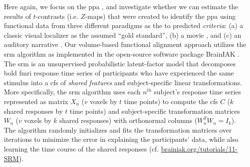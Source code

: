 Here again, we focus on the \ac{ppa} \citep[e.g.,][for
reviews]{epstein2014neural, aminoff2013role}, and investigate whether we can
estimate the results of $t$-contrasts (i.e. $Z$-maps) that were created to
identify the \ac{ppa} using functional data from three different paradigms as
the to predicted \textit{criteria}:
%
(a) a classic visual localizer \citep{sengupta2016extension} as the assumed
``gold standard'',
%
(b) a movie \citep{haeusler2022processing}, and
%
(c) an auditory narrative \citep{haeusler2022processing}.
Our volume-based functional alignment approach utilizes the \ac{srm} algorithm
\citep{chen2015reduced, richard2019fast} as implemented in the open-source
software package BrainIAK \citep[Brain Imaging Analysis Kit;
\href{https://brainiak.org}{\url{brainiak.org}};][]{kumar2020brainiak,
kumar2020brainiaktutorial}.
The \ac{srm} is an unsupervised probabilistic latent-factor model that
decomposes \ac{bold} \ac{fmri} response time series of participants who have
experienced the same stimulus into a \ac{cfs} of \textit{shared features}
\citep[also known as ``\textit{shared feature space}'';][]{chen2015reduced} and
subject-specific linear transformations.
More specifically, the \ac{srm} algorithm uses each $n^{th}$ subject's response
time series represented as matrix $X_{n}$ ({$v$} voxels by $t$ time points) to
compute the \ac{cfs} $C$ ($k$ shared responses by $t$ time points) and
subject-specific transformation matrices $W_{n}$ ($v$ voxels by $k$ shared
responses) with orthonormal columns ($W_{n}^{T}W_{n}=I_{k}$).
The algorithm randomly initializes and fits the transformation matrices over
iterations to minimize the error in explaining the participants' data, while
also learning the time course of the shared responses (cf.
\href{https://brainiak.org/tutorials/11-SRM/}{\url{brainiak.org/tutorials/11-SRM}}).
